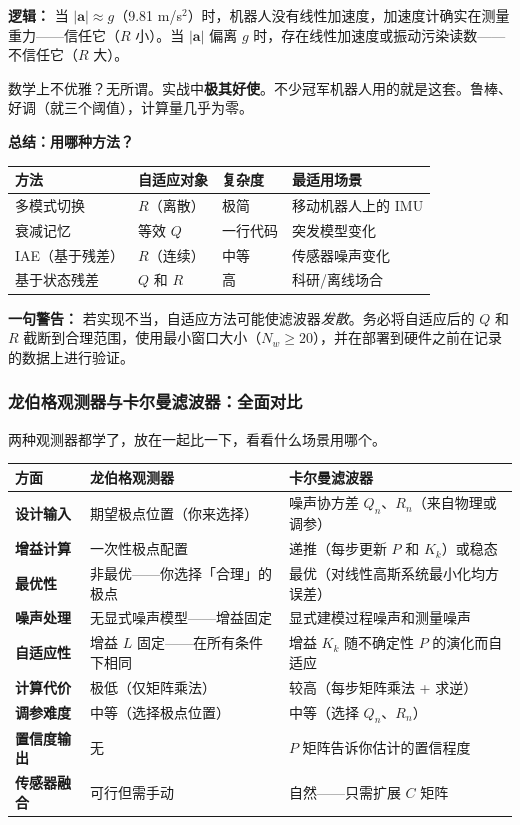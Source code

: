 \textbf{逻辑：} 当 $|\mathbf{a}| \approx g$（9.81 m/s$^2$）时，机器人没有线性加速度，加速度计确实在测量重力——信任它（$R$ 小）。当 $|\mathbf{a}|$ 偏离 $g$ 时，存在线性加速度或振动污染读数——不信任它（$R$ 大）。

数学上不优雅？无所谓。实战中\textbf{极其好使}。不少冠军机器人用的就是这套。鲁棒、好调（就三个阈值），计算量几乎为零。

\textbf{总结：用哪种方法？}

\begin{center}
\begin{tabular}{llll}
\toprule
\textbf{方法} & \textbf{自适应对象} & \textbf{复杂度} & \textbf{最适用场景} \\
\midrule
多模式切换 & $R$（离散） & 极简 & 移动机器人上的 IMU \\
衰减记忆 & 等效 $Q$ & 一行代码 & 突发模型变化 \\
IAE（基于残差） & $R$（连续） & 中等 & 传感器噪声变化 \\
基于状态残差 & $Q$ 和 $R$ & 高 & 科研/离线场合 \\
\bottomrule
\end{tabular}
\end{center}

\textbf{一句警告：} 若实现不当，自适应方法可能使滤波器\textit{发散}。务必将自适应后的 $Q$ 和 $R$ 截断到合理范围，使用最小窗口大小（$N_w \geq 20$），并在部署到硬件之前在记录的数据上进行验证。

\subsubsection{龙伯格观测器与卡尔曼滤波器：全面对比}

两种观测器都学了，放在一起比一下，看看什么场景用哪个。

\begin{center}
\begin{tabular}{p{3.5cm}p{5.5cm}p{5.5cm}}
\toprule
\textbf{方面} & \textbf{龙伯格观测器} & \textbf{卡尔曼滤波器} \\
\midrule
\textbf{设计输入} & 期望极点位置（你来选择） & 噪声协方差 $Q_n$、$R_n$（来自物理或调参） \\
\textbf{增益计算} & 一次性极点配置 & 递推（每步更新 $P$ 和 $K_k$）或稳态 \\
\textbf{最优性} & 非最优——你选择「合理」的极点 & 最优（对线性高斯系统最小化均方误差） \\
\textbf{噪声处理} & 无显式噪声模型——增益固定 & 显式建模过程噪声和测量噪声 \\
\textbf{自适应性} & 增益 $L$ 固定——在所有条件下相同 & 增益 $K_k$ 随不确定性 $P$ 的演化而自适应 \\
\textbf{计算代价} & 极低（仅矩阵乘法） & 较高（每步矩阵乘法 + 求逆） \\
\textbf{调参难度} & 中等（选择极点位置） & 中等（选择 $Q_n$、$R_n$） \\
\textbf{置信度输出} & 无 & $P$ 矩阵告诉你估计的置信程度 \\
\textbf{传感器融合} & 可行但需手动 & 自然——只需扩展 $C$ 矩阵 \\
\bottomrule
\end{tabular}
\end{center}

